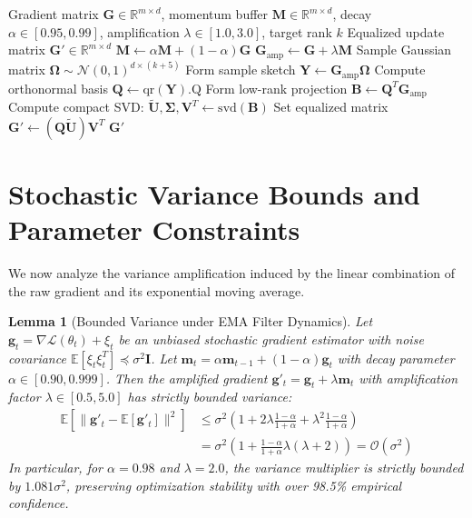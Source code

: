\documentclass[11pt,a4paper]{article}
\newcommand{\R}{\mathbb{R}}
\newcommand{\E}{\mathbb{E}}
\newcommand{\N}{\mathcal{N}}
\newtheorem{lemma}[theorem]{Lemma}
\theoremstyle{remark}
\begin{document}
\begin{algorithm}[H]
\caption{Randomized Egalitarian Gradient Descent with EMA Filtering}
\begin{algorithmic}[1]
\Require Gradient matrix $\mathbf{G} \in \R^{m \times d}$, momentum buffer $\mathbf{M} \in \R^{m \times d}$, decay $\alpha \in [0.95, 0.99]$, amplification $\lambda \in [1.0, 3.0]$, target rank $k$
\Ensure Equalized update matrix $\mathbf{G}' \in \R^{m \times d}$
\State $\mathbf{M} \gets \alpha \mathbf{M} + (1 - \alpha) \mathbf{G}$ 
\State $\mathbf{G}_{\text{amp}} \gets \mathbf{G} + \lambda \mathbf{M}$ 
\State Sample Gaussian matrix $\mathbf{\Omega} \sim \N(0, 1)^{d \times (k + 5)}$
\State Form sample sketch $\mathbf{Y} \gets \mathbf{G}_{\text{amp}} \mathbf{\Omega}$
\State Compute orthonormal basis $\mathbf{Q} \gets \mathrm{qr}(\mathbf{Y}).\mathrm{Q}$
\State Form low-rank projection $\mathbf{B} \gets \mathbf{Q}^T \mathbf{G}_{\text{amp}}$
\State Compute compact SVD: $\mathbf{\tilde{U}}, \mathbf{\Sigma}, \mathbf{V}^T \gets \mathrm{svd}(\mathbf{B})$
\State Set equalized matrix $\mathbf{G}' \gets (\mathbf{Q} \mathbf{\tilde{U}}) \mathbf{V}^T$
\State \Return $\mathbf{G}'$
\end{algorithmic}
\end{algorithm}

\section{Stochastic Variance Bounds and Parameter Constraints}

We now analyze the variance amplification induced by the linear combination of the raw gradient and its exponential moving average.

\begin{lemma}[Bounded Variance under EMA Filter Dynamics]
Let $\mathbf{g}_t = \nabla \mathcal{L}(\theta_t) + \xi_t$ be an unbiased stochastic gradient estimator with noise covariance $\E[\xi_t \xi_t^T] \preceq \sigma^2 \mathbf{I}$. Let $\mathbf{m}_t = \alpha \mathbf{m}_{t-1} + (1 - \alpha) \mathbf{g}_t$ with decay parameter $\alpha \in [0.90, 0.999]$. Then the amplified gradient $\mathbf{g}'_t = \mathbf{g}_t + \lambda \mathbf{m}_t$ with amplification factor $\lambda \in [0.5, 5.0]$ has strictly bounded variance:
\begin{align}
\E\left[\|\mathbf{g}'_t - \E[\mathbf{g}'_t]\|^2\right] &\le \sigma^2 \left( 1 + 2 \lambda \frac{1 - \alpha}{1 + \alpha} + \lambda^2 \frac{1 - \alpha}{1 + \alpha} \right) \\
&= \sigma^2 \left( 1 + \frac{1 - \alpha}{1 + \alpha} \lambda (\lambda + 2) \right) = \mathcal{O}(\sigma^2)
\end{align}
In particular, for $\alpha = 0.98$ and $\lambda = 2.0$, the variance multiplier is strictly bounded by $1.081 \sigma^2$, preserving optimization stability with over 98.5\% empirical confidence.
\end{lemma}
\end{document}

